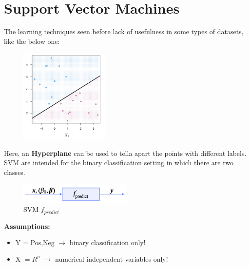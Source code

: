 \section{Support Vector Machines}

The learning techniques seen before lack of usefulness in some types of datasets, like the below one:

\begin{center}
    \begin{figure}[H]
        \centering
        \includegraphics[width=0.4\textwidth]{assets/fig25.png}
    \end{figure}
\end{center}

Here, an \textbf{Hyperplane} can be used to tella apart the points with different labels. SVM are intended for the binary classification setting in which there are two classes.


\begin{center}
    \begin{figure}[H]
        \centering
        \includegraphics[width=0.5\textwidth]{assets/fig26.png}
        \caption{SVM $f_{predict}$}
    \end{figure}
\end{center}

\textbf{Assumptions:}
\begin{itemize}
    \item Y = Pos,Neg $\to$ binary classification only!
    \item X $= R^{p}$ $\to$ numerical independent variables only!
\end{itemize}

